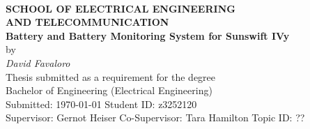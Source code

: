 \begin{center}
\\[0.5cm]
\textbf{\large SCHOOL OF ELECTRICAL ENGINEERING\\
AND TELECOMMUNICATION}\\[2cm]
{\addtolength{\baselineskip}{0.5cm}
\textbf{\Huge
Battery and Battery Monitoring System for Sunswift IVy} \\[0.5cm]
}
{\Large by}\\[0.5cm]
\textit{\huge
David Favaloro} \\[1.5cm]
{\Large
Thesis submitted as a requirement for the degree\\
Bachelor of Engineering (Electrical Engineering)\\[2ex]
\vfill
Submitted: \today\hfill
Student ID: z3252120\\[-1.5ex]
Supervisor: Gernot Heiser\hfill
Co-Supervisor: Tara Hamilton
Topic ID: ??\\
\vspace*{-1cm}
}
\end{center}

